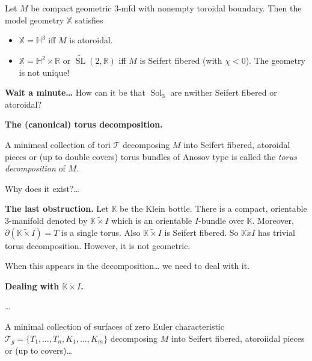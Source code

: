 \begin{theorem}
\label{theorem-classification-compact}
Let $M$ be compact geometric 3-mfd with
nonempty toroidal boundary. Then the model
geometry $\mathbb{X}$ satisfies
\begin{itemize}
\item $\mathbb{X}=\mathbb{H}^3$ iff $M$ is
atoroidal.
\item $\mathbb{X}=\mathbb{H}^2 \times \mathbb{R}$
or
$\widetilde{\operatorname{SL}}(2,\mathbb{R})$
iff $M$ is Seifert fibered (with $\chi
<0$). The geometry is not unique!
\end{itemize}
\end{theorem}

\medskip\noindent
{\bf Wait a minute…}
How can it be that $\operatorname{Sol}_3$
are nwither Seifert fibered or atoroidal?

\medskip\noindent
{\bf The (canonical) torus decomposition.}

\begin{definition}
\label{definition-torus-decomposition}
A minimcal collection of tori
$\mathcal{T}$ decomposing $M$ into Seifert
fibered, atoroidal pieces or (up to double
covers) torus bundles of Anosov type
is called the {\it torus decomposition} of
$M$.
\end{definition} 

\noindent
Why does it exist?… 

\medskip\noindent
{\bf The last obstruction.}
Let $\mathbb{K}$ be the Klein bottle.
There is a compact, orientable 3-manifold
denoted by $\mathbb{K} \tilde{\times} I$
which is an orientable $I$-bundle over
$\mathbb{K}$. Moreover,
$\partial(\mathbb{K}\tilde{\times}I)=T$
is a single torus.
Also $\mathbb{K}\tilde{\times}I$ is Seifert
fibered. So $\mathbb{K}\tilde{x}I$
has trivial torus decomposition. However, it
is not geometric.

When this appears in the decomposition…
we need to deal with it.

\medskip\noindent
{\bf Dealing with
$\mathbb{K}\tilde{\times}I$.}

…

\begin{definition}
\label{definition-geometric-decomposition}
A minimal collection of surfaces of zero
Euler characteristic $\mathcal{T}_g=
\{T_1,…,T_n,K_1,…,K_m\}$
decomposing $M$ into Seifert fibered,
atoroiidal pieces or (up to covers)…
\end{definition}


